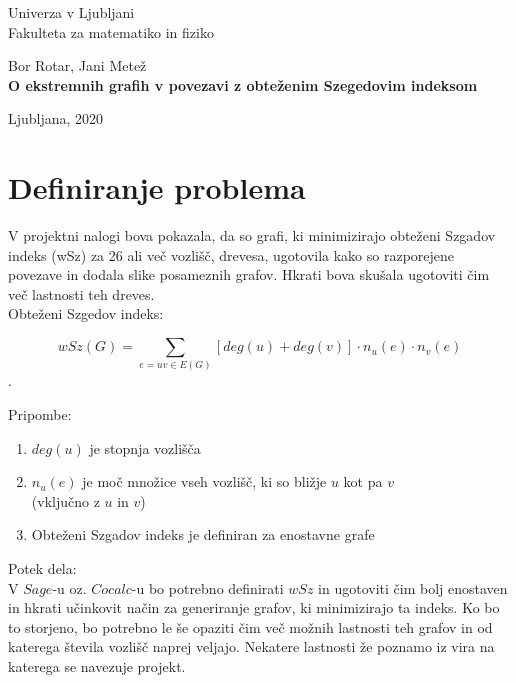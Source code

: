 \documentclass[12pt, a4paper]{article}
\begin{document}
\begin{titlepage}
\begin{center}

\large
Univerza v Ljubljani\\
\normalsize
Fakulteta za matematiko in fiziko\\

\vspace{3 cm} 

\large
Bor Rotar, Jani Metež\\

\vspace{3 cm}
\LARGE
\textbf{O ekstremnih grafih v povezavi z obteženim Szegedovim indeksom}

\vfill

\large Ljubljana, 2020

\end{center}
\end{titlepage}

\newpage

\section[Definiranje problema]{Definiranje problema}

V projektni nalogi bova pokazala, da so grafi, ki minimizirajo obteženi Szgadov indeks (wSz) za 26 ali več vozlišč, drevesa, ugotovila kako so razporejene povezave in dodala slike posameznih grafov. Hkrati bova skušala ugotoviti čim več lastnosti teh dreves.\\


Obteženi Szgedov indeks:
\begin{center}
 $$wSz(G) =\sum_{e=uv \in E(G)}[deg(u)+ deg(v) ]\cdot n_{u}(e)\cdot n_{v}(e)$$.
\end{center}
\medskip
Pripombe:
\begin{enumerate}
\item $deg(u)$ je stopnja vozlišča
\item $n_{u}(e)$ je moč množice vseh vozlišč, ki so bližje $u$ kot pa $v$ \\ (vključno z $u$ in $v$)
\item Obteženi Szgadov indeks je definiran za enostavne grafe
\end{enumerate}
\medskip

\medskip
Potek dela: \\

V $Sage$-u oz. $Cocalc$-u bo potrebno definirati $wSz$ in ugotoviti čim bolj enostaven in hkrati učinkovit način za generiranje grafov, ki minimizirajo ta indeks. Ko bo to storjeno, bo potrebno le še opaziti čim več možnih lastnosti teh grafov in od katerega števila vozlišč naprej veljajo. Nekatere lastnosti že poznamo iz vira na katerega se navezuje projekt.
\end{document}
